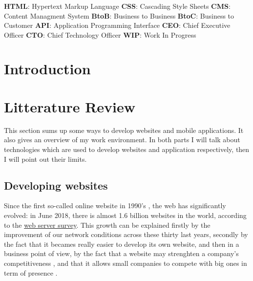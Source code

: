 \documentclass{article}
\begin{document}
        \textbf{HTML}: Hypertext Markup Language \newline
        \textbf{CSS}: Cascading Style Sheets \newline
        \textbf{CMS}: Content Managment System \newline
        \textbf{BtoB}: Business to Business \newline
        \textbf{BtoC}: Business to Customer \newline
        \textbf{API}: Application Programming Interface \newline
        \textbf{CEO}: Chief Executive Officer \newline
        \textbf{CTO}: Chief Technology Officer \newline
        \textbf{WIP}: Work In Progress

        
        \newpage
        \section{Introduction}

        
        \newpage
        \section{Litterature Review}
            This section sums up some ways to develop websites and mobile applications. It also gives an overview of
            my work environment.
            In both parts I will talk about technologies which are used to develop websites and application respectively,
            then I will point out their limits.
                \subsection{Developing websites}
                    Since the first so-called online website in 1990's \cite{history}, the web has significantly evolved: in June 2018, there is
                    almost 1.6 billion websites in the world, according to the \href{https://news.netcraft.com/archives/2018/06/13/june-2018-web-server-survey.html}{web server survey}.
                    This growth can be explained firstly by the improvement of our network conditions across these thirty last years, secondly by the fact that it 
                    becames really easier to develop its own website, and then in a business point of view,
                    by the fact that a website may strenghten a company's competitiveness \cite{compet}, and
                    that it allows small companies to compete with big ones in term of presence \cite{presence}.
\end{document}
